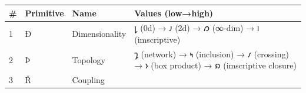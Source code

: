 \documentclass[12pt,a4paper]{article}
\begin{document}
\begin{longtable}[]{@{}llll@{}}
\toprule
\begin{minipage}[b]{0.07\columnwidth}\raggedright
\#\strut
\end{minipage} & \begin{minipage}[b]{0.24\columnwidth}\raggedright
Primitive\strut
\end{minipage} & \begin{minipage}[b]{0.13\columnwidth}\raggedright
Name\strut
\end{minipage} & \begin{minipage}[b]{0.44\columnwidth}\raggedright
Values (low→high)\strut
\end{minipage}\tabularnewline
\midrule
\endhead
\begin{minipage}[t]{0.07\columnwidth}\raggedright
1\strut
\end{minipage} & \begin{minipage}[t]{0.24\columnwidth}\raggedright
\(Ð\)\strut
\end{minipage} & \begin{minipage}[t]{0.13\columnwidth}\raggedright
Dimensionality\strut
\end{minipage} & \begin{minipage}[t]{0.44\columnwidth}\raggedright
𐑛 (0d) → 𐑨 (2d) → 𐑼 (∞-dim) → 𐑦 (imscriptive)\strut
\end{minipage}\tabularnewline
\begin{minipage}[t]{0.07\columnwidth}\raggedright
2\strut
\end{minipage} & \begin{minipage}[t]{0.24\columnwidth}\raggedright
\(Þ\)\strut
\end{minipage} & \begin{minipage}[t]{0.13\columnwidth}\raggedright
Topology\strut
\end{minipage} & \begin{minipage}[t]{0.44\columnwidth}\raggedright
𐑡 (network) → 𐑰 (inclusion) → 𐑥 (crossing) → 𐑶 (box product) → 𐑸
(imscriptive closure)\strut
\end{minipage}\tabularnewline
\begin{minipage}[t]{0.07\columnwidth}\raggedright
3\strut
\end{minipage} & \begin{minipage}[t]{0.24\columnwidth}\raggedright
\(Ř\)\strut
\end{minipage} & \begin{minipage}[t]{0.13\columnwidth}\raggedright
Coupling\strut

\end{minipage}
\end{longtable}
\end{document}
